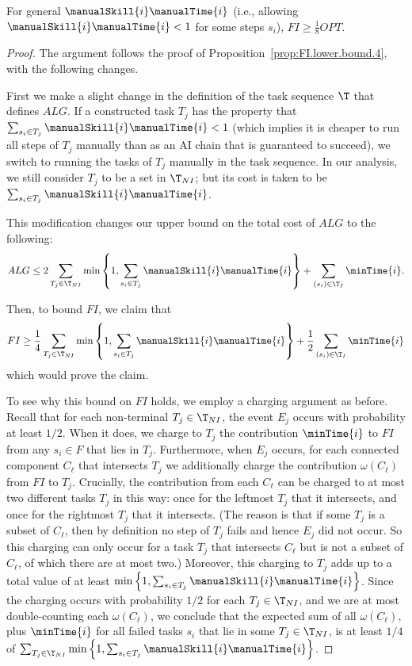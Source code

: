 \begin{proposition}
\label{prop:FI.lower.bound.8}
    For general $\manualSkill{i}\manualTime{i}$ (i.e., allowing $\manualSkill{i}\manualTime{i} < 1$ for some steps $s_i$), $FI \geq \frac{1}{8}OPT$.
\end{proposition}
\begin{proof}
    The argument follows the proof of Proposition~\ref{prop:FI.lower.bound.4}, with the following changes.

    First we make a slight change in the definition of the task sequence $\T$ that defines $ALG$.  
    If a constructed task $T_j$ has the property that $\sum_{s_i \in T_j} \manualSkill{i}\manualTime{i} < 1$ (which implies it is cheaper to run all steps of $T_j$ manually than as an AI chain that is guaranteed to succeed), we switch to running the tasks of $T_j$ manually in the task sequence.  
    In our analysis, we still consider $T_j$ to be a set in $\T_{NI}$; but its cost is taken to be $\sum_{s_i \in T_j} \manualSkill{i}\manualTime{i}$.

    This modification changes our upper bound on the total cost of $ALG$ to the following:
    \[ ALG \leq 2 \sum_{T_j \in \T_{NI}} \min\left\{1, \sum_{s_i \in T_j} \manualSkill{i}\manualTime{i} \right\} + \sum_{ (s_i) \in \T_I} \minTime{i}. \]

    Then, to bound $FI$, we claim that 
    \[ FI \geq \frac{1}{4}\sum_{T_j \in \T_{NI}} \min\left\{1, \sum_{s_i \in T_j} \manualSkill{i}\manualTime{i} \right\} + \frac{1}{2}\sum_{(s_i) \in \T_I} \minTime{i} \]
    which would prove the claim.

    To see why this bound on $FI$ holds, we employ a charging argument as before.  
    Recall that for each non-terminal $T_j \in \T_{NI}$, the event $E_j$ occurs with probability at least $1/2$.  
    When it does, we charge to $T_j$ the contribution $\minTime{i}$ to $FI$ from any $s_i \in F$ that lies in $T_j$.  
    Furthermore, when $E_j$ occurs, for each connected component $C_\ell$ that intersects $T_j$ we additionally charge the contribution $\omega(C_\ell)$ from $FI$ to $T_j$.   
    Crucially, the contribution from each $C_\ell$ can be charged to at most two different tasks $T_j$ in this way: once for the leftmost $T_j$ that it intersects, and once for the rightmost $T_j$ that it intersects.  
    (The reason is that if some $T_j$ is a subset of $C_\ell$, then by definition no step of $T_j$ fails and hence $E_j$ did not occur.  
    So this charging can only occur for a task $T_j$ that intersects $C_\ell$ but is not a subset of $C_\ell$, of which there are at most two.)  
    Moreover, this charging to $T_j$ adds up to a  total value of at least $\min\left\{1, \sum_{s_i \in T_j} \manualSkill{i}\manualTime{i} \right\}$.  
    Since the charging occurs with probability $1/2$ for each $T_j \in \T_{NI}$, and we are at most double-counting each $\omega(C_\ell)$, we conclude that the expected sum of all $\omega(C_\ell)$, plus $\minTime{i}$ for all failed tasks $s_i$ that lie in some $T_j \in \T_{NI}$, is at least $1/4$ of $\sum_{T_j \in \T_{NI}}\min\left\{1, \sum_{s_i \in T_j} \manualSkill{i}\manualTime{i} \right\}$.


\end{proof}
